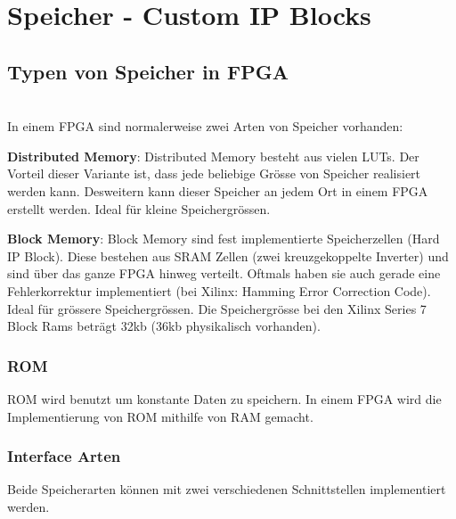 \section{Speicher - Custom IP Blocks}
\subsection{Typen von Speicher in FPGA}$~$ \\
In einem FPGA sind normalerweise zwei Arten von Speicher vorhanden:
\begin{compactitem}
    \item \textbf{Distributed Memory}: Distributed Memory besteht aus vielen LUTs. Der Vorteil dieser Variante ist, dass jede beliebige Grösse von Speicher realisiert werden kann. Desweitern kann dieser Speicher an jedem Ort in einem FPGA erstellt werden. Ideal für kleine Speichergrössen.
    \item \textbf{Block Memory}: Block Memory sind fest implementierte Speicherzellen (Hard IP Block). Diese bestehen aus SRAM Zellen (zwei kreuzgekoppelte Inverter) und sind über das ganze FPGA hinweg verteilt. Oftmals haben sie auch gerade eine Fehlerkorrektur implementiert (bei Xilinx: Hamming Error Correction Code). Ideal für grössere Speichergrössen. Die Speichergrösse bei den Xilinx Series 7 Block Rams beträgt 32kb (36kb physikalisch vorhanden).
\end{compactitem}

\subsubsection{ROM}
ROM wird benutzt um konstante Daten zu speichern. In einem FPGA wird die Implementierung von ROM mithilfe von RAM gemacht.

\subsubsection{Interface Arten}
Beide Speicherarten können mit zwei verschiedenen Schnittstellen implementiert werden.

